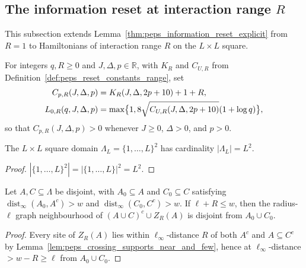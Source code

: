 \subsection{The information reset at interaction range $R$}

This subsection extends Lemma~\ref{thm:peps_information_reset_explicit} from $R=1$ to Hamiltonians of interaction range $R$ on the $L\times L$ square.

\begin{definition}
    \label{def:peps_reset_width_range}
    \leanok
    For integers $q,R\ge0$ and $J,\Delta,p\in\mathbb R$, with $K_R$ and $C_{U,R}$ from Definition~\ref{def:peps_reset_constants_range}, set
    \begin{align}
        C_{p,R}(J,\Delta,p)   & =K_R(J,\Delta,2p+10)+1+R, \notag                                \\
        L_{0,R}(q,J,\Delta,p) & =\max\bigl\{1,8\sqrt{C_{U,R}(J,\Delta,2p+10)}(1+\log q)\bigr\},
        \label{eq:peps_reset_width_range}
    \end{align}
    so that $C_{p,R}(J,\Delta,p)>0$ whenever $J\ge0$, $\Delta>0$, and $p>0$.
\end{definition}

\begin{lemma}
    \label{thm:peps_square_site_count}
    \leanok
    The $L\times L$ square domain $\Lambda_L=\{1,\ldots,L\}^2$ has cardinality $|\Lambda_L|=L^2$.
\end{lemma}
\begin{proof}
    \leanok
    $|\{1,\ldots,L\}^2|=|\{1,\ldots,L\}|^2=L^2$.
\end{proof}

\begin{lemma}
    \label{thm:peps_reset_support_cores_range}
    \leanok
    Let $A,C\subseteq\Lambda$ be disjoint, with $A_0\subseteq A$ and $C_0\subseteq C$ satisfying $\operatorname{dist}_\infty(A_0,A^c)>w$ and $\operatorname{dist}_\infty(C_0,C^c)>w$. If $\ell+R\le w$, then the radius-$\ell$ graph neighbourhood of $(A\cup C)^c\cup Z_R(A)$ is disjoint from $A_0\cup C_0$.
\end{lemma}
\begin{proof}
    \leanok
    Every site of $Z_R(A)$ lies within $\ell_\infty$-distance $R$ of both $A^c$ and $A\subseteq C^c$ by Lemma~\ref{lem:peps_crossing_supports_near_and_few}, hence at $\ell_\infty$-distance $>w-R\ge\ell$ from $A_0\cup C_0$.
\end{proof}

